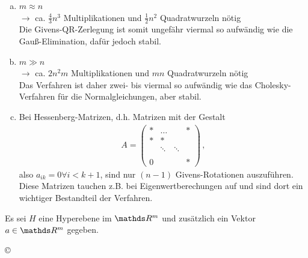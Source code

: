 \begin{enumerate}[a)]
\item $m\approx n$\\ $\rightarrow $  ca. $\frac{4}{3}n^3$ Multiplikationen
  und $\frac{1}{2}n^2$ Quadratwurzeln nötig \\
  Die Givens-QR-Zerlegung ist somit ungefähr viermal so aufwändig
  wie die Gauß-Elimination, dafür jedoch stabil.
\item $m\gg n$\\ $\rightarrow $ ca. $2n^2m$ Multiplikationen und 
  $mn$ Quadratwurzeln nötig \\
  Das Verfahren ist daher zwei- bis viermal so aufwändig wie das
  Cholesky-Verfahren für die Normalgleichungen, aber stabil.
\item Bei Hessenberg-Matrizen, d.h. Matrizen mit der Gestalt
  \begin{gather}
    A= \begin{pmatrix}
      * & \dots&& * \\
      *&* \\
      &\ddots& \ddots \\
      \\
      0 &&& * 
    \end{pmatrix}
    \label{IV.4.7} \, ,
  \end{gather}
  also $a_{ik} = 0 \forall i<k+1$,
  sind nur $(n-1)$ Givens-Rotationen auszuführen. \\
  Diese Matrizen tauchen z.B. bei Eigenwertberechungen auf
  und sind dort ein wichtiger Bestandteil der Verfahren.
\end{enumerate}



Es sei $H$ eine Hyperebene im $\R^m$ und zusätzlich ein Vektor
$a\in\R^m$ gegeben.

\begin{image}{\copyright}
\end{image}

